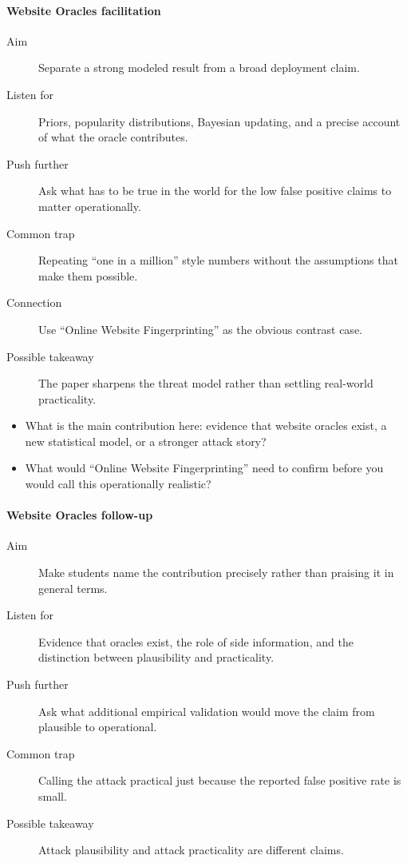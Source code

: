 \paragraph{Website Oracles facilitation}
\begin{description}
  \item[Aim] Separate a strong modeled result from a broad deployment claim.
  \item[Listen for] Priors, popularity distributions, Bayesian updating, and a
    precise account of what the oracle contributes.
  \item[Push further] Ask what has to be true in the world for the low false
    positive claims to matter operationally.
  \item[Common trap] Repeating \enquote{one in a million} style numbers without
    the assumptions that make them possible.
  \item[Connection] Use \enquote{Online Website Fingerprinting} as the obvious
    contrast case.
  \item[Possible takeaway] The paper sharpens the threat model rather than
    settling real-world practicality.
\end{description}

\begin{frame}
  \begin{question}
    \begin{itemize}
      \item What is the main contribution here: evidence that website oracles
        exist, a new statistical model, or a stronger attack story?
      \item What would \enquote{Online Website Fingerprinting} need to confirm
        before you would call this operationally realistic?
    \end{itemize}
  \end{question}
\end{frame}

\paragraph{Website Oracles follow-up}
\begin{description}
  \item[Aim] Make students name the contribution precisely rather than praising
    it in general terms.
  \item[Listen for] Evidence that oracles exist, the role of side information,
    and the distinction between plausibility and practicality.
  \item[Push further] Ask what additional empirical validation would move the
    claim from plausible to operational.
  \item[Common trap] Calling the attack practical just because the reported
    false positive rate is small.
  \item[Possible takeaway] Attack plausibility and attack practicality are
    different claims.
\end{description}

